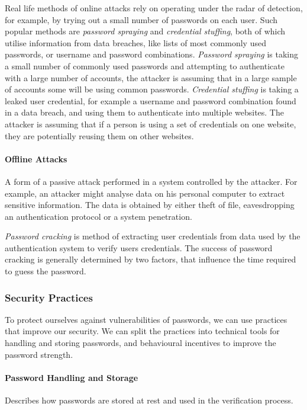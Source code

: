 Real life methods of online attacks rely on operating under the radar of detection, for example, by trying out a small number of passwords on each user.
Such popular methods are \textit{password spraying} and \textit{credential stuffing}, both of which utilise information from data breaches, like lists of most commonly used passwords, or username and password combinations.
\textit{Password spraying} is taking a small number of commonly used passwords and attempting to authenticate with a large number of accounts, the attacker is assuming that in a large sample of accounts some will be using common passwords.
\textit{Credential stuffing} is taking a leaked user credential, for example a username and password combination found in a data breach, and using them to authenticate into multiple websites. 
The attacker is assuming that if a person is using a set of credentials on one website, they are potentially reusing them on other websites.

\paragraph{Offline Attacks} 
A form of a passive attack performed in a system controlled by the attacker.
For example, an attacker might analyse data on his personal computer to extract sensitive information. The data is obtained by either theft of file, eavesdropping an authentication protocol or a system penetration.

\textit{Password cracking} is method of extracting user credentials from data used by the authentication system to verify users credentials.
The success of password cracking is generally determined by two factors, that influence the time required to guess the password.

\subsubsection{Security Practices}
\label{password-security-practices}
To protect ourselves against vulnerabilities of passwords, we can use practices that improve our security.
We can split the practices into technical tools for handling and storing passwords, and behavioural incentives to improve the password strength.

\paragraph{Password Handling and Storage}
Describes how passwords are stored at rest and used in the verification process.

